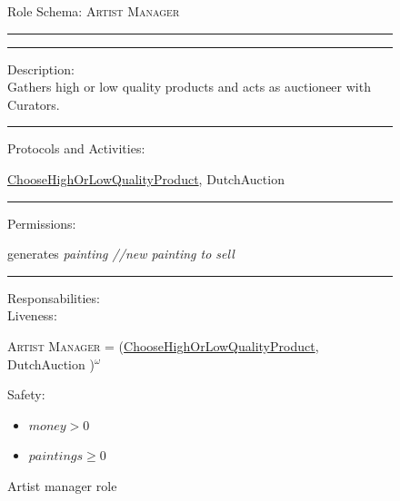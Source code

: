 \documentclass[a4paper,11pt]{report}
\begin{document}
  \begin{figure}[ht!]
    \begin{mdframed}
      Role Schema: \textsc{Artist Manager} \\ \hrule \vspace{2pt} \hrule \vspace{10pt}
      Description:\\
      Gathers high or low quality products and acts as auctioneer with Curators.
      \\ \hrule \vspace{10pt}
      Protocols and Activities:
      \vspace{-10pt}
      \begin{flushleft}
       \underline{ChooseHighOrLowQualityProduct}, 
       DutchAuction 
      \end{flushleft}
      \hrule \vspace{10pt}
      Permissions:\\
      \vspace{-15pt}
      \begin{center}
       generates \textit{painting //new painting to sell}
      \end{center}
      \hrule \vspace{10pt}
      Responsabilities:\\
      Liveness:
      \begin{flushleft}
      \small\textsc{Artist Manager} = (\underline{ChooseHighOrLowQualityProduct}, 
      DutchAuction 
      )$^\omega$
      \end{flushleft}
      Safety:
      \begin{itemize}
      \itemsep0pt
       \item $money > 0$
       \item $paintings \geq 0$
      \end{itemize}
    \end{mdframed}
  \caption{Artist manager role}
  \label{figure:role_artist_manager}
  \end{figure}
  
\end{document}
